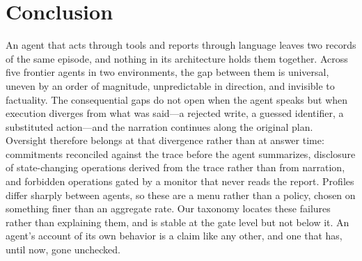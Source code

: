 \section{Conclusion}
\label{sec: conclusion}

An agent that acts through tools and reports through language leaves two records
of the same episode, and nothing in its architecture holds them together. Across five frontier agents in two environments, the gap between them is universal, uneven by an order of magnitude, unpredictable in direction,
and invisible to factuality. The consequential gaps do not open when the agent
speaks but when execution diverges from what was said---a rejected write, a guessed
identifier, a substituted action---and the narration
continues along the original plan. Oversight therefore belongs at that
divergence rather than at answer time: commitments reconciled against the trace
before the agent summarizes, disclosure of state-changing operations derived
from the trace rather than from narration, and forbidden operations gated by a
monitor that never reads the report. Profiles differ sharply
between agents, so these are a menu rather than a policy, chosen on something
finer than an aggregate rate. Our taxonomy locates these failures
rather than explaining them, and is stable at the gate level but not below it.
An agent's account of its own behavior is a claim like any other, and one that
has, until now, gone unchecked.
